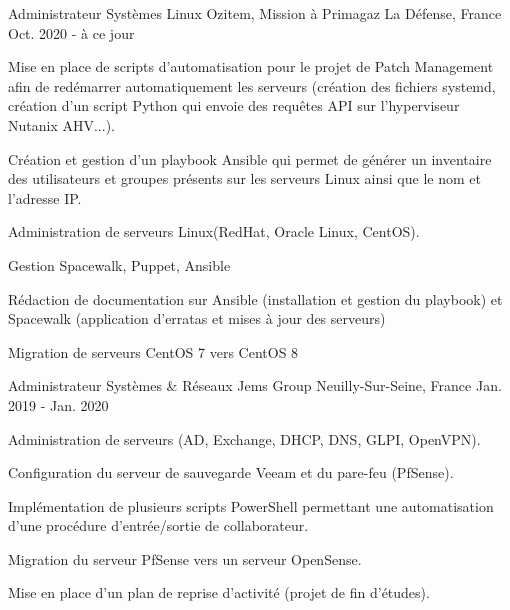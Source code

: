 

\begin{cventries}

  \cventry
    {Administrateur Systèmes Linux} %
    {Ozitem, Mission à Primagaz} %
    {La Défense, France} %
    {Oct. 2020 - à ce jour} %
    {
      \begin{cvitems} %
        \item {Mise en place de scripts d'automatisation pour le projet de Patch Management afin de redémarrer automatiquement les serveurs (création des fichiers systemd, création d'un script Python qui envoie des requêtes API sur l'hyperviseur Nutanix AHV...).}
        \item {Création et gestion d'un playbook Ansible qui permet de générer un inventaire des utilisateurs et groupes présents sur les serveurs Linux ainsi que le nom et l'adresse IP.}
        \item {Administration de serveurs Linux(RedHat, Oracle Linux, CentOS).}
        \item {Gestion Spacewalk, Puppet, Ansible}
        \item {Rédaction de documentation sur Ansible (installation et gestion du playbook) et Spacewalk (application d'erratas et mises à jour des serveurs)}
        \item {Migration de serveurs CentOS 7 vers CentOS 8}
      \end{cvitems}
    }

  \cventry
    {Administrateur Systèmes \& Réseaux} %
    {Jems Group} %
    {Neuilly-Sur-Seine, France} %
    {Jan. 2019 - Jan. 2020} %
    {
      \begin{cvitems} %
        \item {Administration de serveurs (AD, Exchange, DHCP, DNS, GLPI, OpenVPN).}
        \item {Configuration du serveur de sauvegarde Veeam et du pare-feu (PfSense).}
        \item {Implémentation de plusieurs scripts PowerShell permettant une automatisation d'une procédure d'entrée/sortie de collaborateur.}
        \item {Migration du serveur PfSense vers un serveur OpenSense.}
        \item {Mise en place d'un plan de reprise d'activité (projet de fin d'études).}
      \end{cvitems}
    }


\end{cventries}
